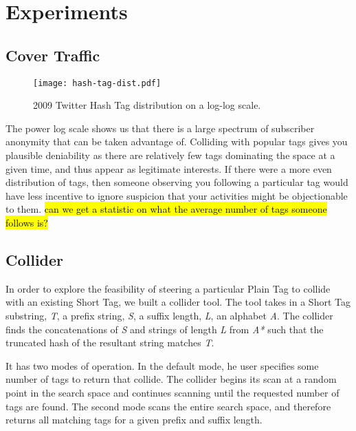 \section{Experiments}

\subsection{Cover Traffic}

\begin{figure}
\begin{center}
\texttt{[image: hash-tag-dist.pdf]}
\caption{2009 Twitter Hash Tag distribution on a log-log scale.
\label{fig:hash-dist}
}
\end{center}
\end{figure}

The power log scale shows us that there is a large spectrum of subscriber anonymity that can be taken advantage of. Colliding with popular tags gives you plausible deniability as there are relatively few tags dominating the space at a given time, and thus appear as legitimate interests. If there were a more even distribution of tags, then someone observing you following a particular tag would have less incentive to ignore suspicion that your activities might be objectionable to them. \hl{can we get a statistic on what the average number of tags someone follows is?}


\subsection{Collider}

In order to explore the feasibility of steering a particular Plain Tag to collide with an existing Short Tag, we built a collider tool. The tool takes in a Short Tag substring, \textit{T}, a prefix string, \textit{S}, a suffix length, \textit{L}, an alphabet 
\textit{A}. The collider finds the concatenations of \textit{S} and strings of length \textit{L} from \textit{A*} such that the truncated hash of the resultant string matches \textit{T}.

It has two modes of operation. In the default mode, he user specifies some number of tags to return that collide. The collider begins its scan at a random point in the search space and continues scanning until the requested number of tags are found. The second mode scans the entire search space, and therefore returns all matching tags for a given prefix and suffix length.

